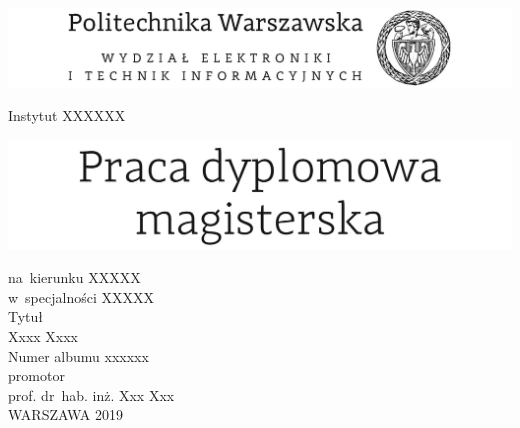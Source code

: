 \documentclass[12pt, twoside, openany]{mwrep}
\begin{document}
\begin{titlepage}
    \begin{center}
        {\sffamily
            \begin{center}
                \includegraphics[width=\textwidth]{titlepage/szablonEITI.png}\\   
            \end{center}
            \hfill \break
            \hfill \break
            Instytut XXXXXX\\
            \hfill \break
            \hfill \break
            \begin{center}
                \includegraphics[width=\textwidth]{titlepage/szablonMGR.png}\\
            \end{center}
            na~kierunku XXXXX\\
            w~specjalności XXXXX\\
            \hfill \break
            \hfill \break
            \large
            Tytuł\\
            \hfill \break
            \hfill \break
            \LARGE
            Xxxx Xxxx\\
            \normalsize
            Numer albumu xxxxxx\\
            \hfill \break
            \hfill \break
            promotor\\
            prof. dr~hab. inż. Xxx Xxx\\
            \vfill
            WARSZAWA 2019
        }
    \end{center}
    \newpage
    \thispagestyle{empty}
    \hfill
    
    \newpage

\end{titlepage}
\end{document}

